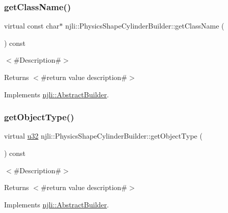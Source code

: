 \subsubsection{\texorpdfstring{get\+Class\+Name()}{getClassName()}}
{\footnotesize\ttfamily virtual const char$\ast$ njli\+::\+Physics\+Shape\+Cylinder\+Builder\+::get\+Class\+Name (\begin{DoxyParamCaption}{ }\end{DoxyParamCaption}) const\hspace{0.3cm}{\ttfamily [virtual]}}

$<$\#\+Description\#$>$

\begin{DoxyReturn}{Returns}
$<$\#return value description\#$>$ 
\end{DoxyReturn}


Implements \mbox{\hyperlink{classnjli_1_1_abstract_builder_a902f73ea78031b06aca183a417f3413b}{njli\+::\+Abstract\+Builder}}.

\mbox{\label{classnjli_1_1_physics_shape_cylinder_builder_ad0664106b9916319c22dc2f3e1d667a2}} 
\subsubsection{\texorpdfstring{get\+Object\+Type()}{getObjectType()}}
{\footnotesize\ttfamily virtual \mbox{\hyperlink{_util_8h_a10e94b422ef0c20dcdec20d31a1f5049}{u32}} njli\+::\+Physics\+Shape\+Cylinder\+Builder\+::get\+Object\+Type (\begin{DoxyParamCaption}{ }\end{DoxyParamCaption}) const\hspace{0.3cm}{\ttfamily [virtual]}}

$<$\#\+Description\#$>$

\begin{DoxyReturn}{Returns}
$<$\#return value description\#$>$ 
\end{DoxyReturn}


Implements \mbox{\hyperlink{classnjli_1_1_abstract_builder_a0f2d344fcf697b167f4f2b1122b5fb33}{njli\+::\+Abstract\+Builder}}.

\mbox{\label{classnjli_1_1_physics_shape_cylinder_builder_a898b197c3dcc879ee1ce5d6ccf08b960}} 
